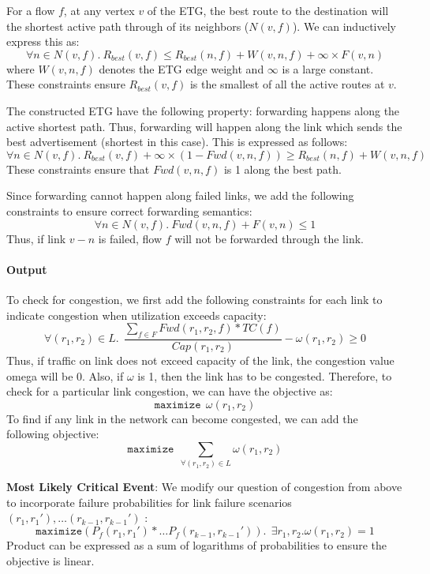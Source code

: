\documentclass[]{article}
\begin{document}
For a flow $f$, at any vertex $v$ of the ETG, the best route to the
destination will the shortest active path through of its neighbors ($N(v,f)$).
We can inductively express this as: 
\begin{equation}
	\forall n \in N(v,f).~ R_{best}(v, f) \leq R_{best} (n, f) + W(v, n, f) + \infty \times F(v,n) 
\end{equation}
where $W(v,n,f)$ denotes the ETG edge weight and $\infty$ is a large constant. These
constraints ensure $R_{best}(v, f)$ is the smallest of all the active routes at $v$.

The constructed ETG have the following property: forwarding happens along the
active shortest path. Thus, forwarding will happen along the link which sends
the best advertisement (shortest in this case). This is expressed as follows:
\begin{equation}
	\forall n \in N(v,f). ~R_{best}(v,f) + \infty \times (1 - Fwd(v,n,f)) \geq R_{best} (n, f) + W(v, n, f)
\end{equation}
These constraints ensure that $Fwd(v,n,f)$ is 1 along the best path.

Since forwarding cannot happen along failed links, we add the following 
constraints to ensure correct forwarding semantics:
\begin{equation}
\forall n \in N(v,f).~Fwd(v,n,f) + F(v,n) \leq 1 
\end{equation}
Thus, if link $v-n$ is failed, flow $f$ will not be forwarded through the link.

\noindent\paragraph{Output} 
To check for congestion, we first add the following constraints for 
each link to indicate congestion when utilization exceeds capacity: 
\begin{equation}
\forall (r_1, r_2) \in L. ~~\frac{\sum_{f \in F} Fwd(r_1, r_2, f) * TC(f)}{Cap(r_1, r_2)} - \omega(r_1, r_2) \geq 0
\end{equation}
Thus, if traffic on link does not exceed capacity of the link, the congestion value
omega will be 0. Also, if $\omega$ is 1, then the link has to be congested. Therefore,
to check for a particular link congestion, we can have the objective as:
\[
\texttt{maximize} ~~\omega(r_1, r_2)
\]	
To find if any link in the network can become congested, we can add the following
objective:
\[
\texttt{maximize} ~~\sum_{\forall (r_1,r_2) \in L} \omega(r_1, r_2)
\]


\textbf{Most Likely Critical Event}: We modify our question of congestion from above to
incorporate failure probabilities for link failure scenarios $(r_1, r_1'),\ldots(r_{k-1}, r_{k-1}')$ : 
\[
\texttt{maximize} (P_f(r_1,r_1') *\ldots P_f(r_{k-1}, r_{k-1}')). 
~~\exists r_1, r_2. \omega(r_1, r_2) = 1
\]
Product can be expressed as a sum of logarithms of probabilities to ensure the objective is linear. 

%
\end{document}

